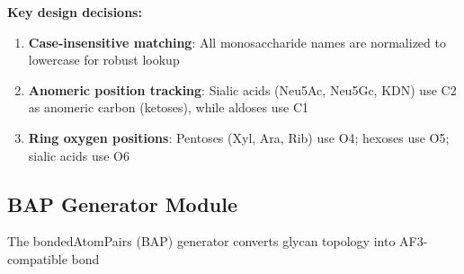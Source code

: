 \textbf{Key design decisions:}

\begin{enumerate}
\item \textbf{Case-insensitive matching}: All monosaccharide names are normalized to lowercase for robust lookup
\item \textbf{Anomeric position tracking}: Sialic acids (Neu5Ac, Neu5Gc, KDN) use C2 as anomeric carbon (ketoses), while aldoses use C1
\item \textbf{Ring oxygen positions}: Pentoses (Xyl, Ara, Rib) use O4; hexoses use O5; sialic acids use O6
\end{enumerate}

\subsection{BAP Generator Module}

The bondedAtomPairs (BAP) generator converts glycan topology into AF3-compatible bond